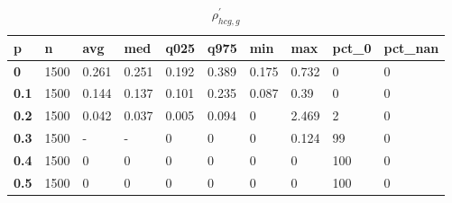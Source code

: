 \begin{table}[h]
 \centering 
\footnotesize
\caption{$\rho_{hcg,g}^\prime $}
\label{tab:alphahcgg}
\begin{tabular}[h]{|l|l|l|l|l|l|l|l|l|l|
    } \hline
\textbf{ p} & \textbf{ n} & \textbf{ avg} & \textbf{ med} & \textbf{ q025} & \textbf{ q975} & \textbf{ min} & \textbf{ max} & \textbf{ pct\_0} & \textbf{ pct\_nan}
    \\ \hline
  \textbf{  0} & 1500 & 0.261 & 0.251 & 0.192 & 0.389 & 0.175 & 0.732 &   0 & 0
    \\ \hline
  \textbf{0.1} & 1500 & 0.144 & 0.137 & 0.101 & 0.235 & 0.087 &  0.39 &   0 & 0
    \\ \hline
  \textbf{0.2} & 1500 & 0.042 & 0.037 & 0.005 & 0.094 &     0 & 2.469 &   2 & 0
    \\ \hline
  \textbf{0.3} & 1500 & - & - &     0 &     0 &     0 & 0.124 &  99 & 0
    \\ \hline
  \textbf{0.4} & 1500 &     0 &     0 &     0 &     0 &     0 &     0 & 100 & 0
    \\ \hline
  \textbf{0.5} & 1500 &     0 &     0 &     0 &     0 &     0 &     0 & 100 & 0
    \\ \hline
 \end{tabular}
 \end{table}
